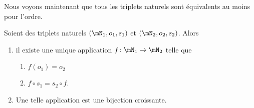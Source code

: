 Nous voyons maintenant que tous les triplets naturels sont équivalents au moins pour l'ordre.

\begin{theorem}     \label{THOooFUXMooJuigHK}
    Soient des triplets naturels \( (\mN_1,o_1,s_1)\) et \( (\mN_2,o_2,s_2)\). Alors
    \begin{enumerate}
        \item
            il existe une unique application \( f\colon \mN_1\to \mN_2\) telle que
            \begin{enumerate}
                \item
                    \( f(o_1)=o_2\)
                \item
                    \( f\circ s_1=s_2\circ f\).
            \end{enumerate}
        \item
            Une telle application est une bijection croissante.
    \end{enumerate}
\end{theorem}

